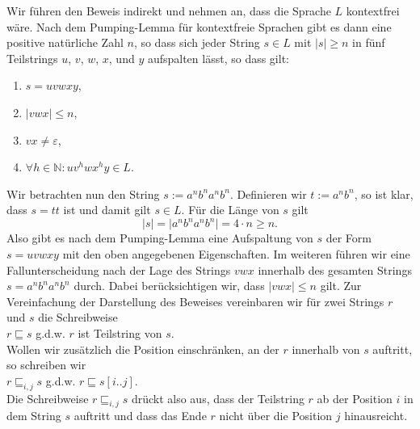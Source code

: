 \solution
Wir f\"uhren den Beweis indirekt und nehmen an, dass die Sprache $L$ kontextfrei
w\"are.  Nach dem Pumping-Lemma f\"ur kontextfreie Sprachen gibt es dann eine positive
nat\"urliche Zahl $n$, so dass sich jeder String $s \in L$ mit $|s| \geq n$ in f\"unf 
Teilstrings $u$, $v$, $w$, $x$, und $y$ aufspalten l\"asst, so dass gilt:
\begin{enumerate}
\item $s = uvwxy$,
\item $|vwx| \leq n$,
\item $vx \not= \varepsilon$,
\item $\forall h \in \mathbb{N}: uv^hwx^hy \in L$. 
\end{enumerate} 
Wir betrachten nun den String $s := a^{n}b^{n}a^{n}b^{n}$.  Definieren wir $t:= a^nb^n$,
so ist klar, dass $s = tt$ ist und damit gilt $s \in L$.
F\"ur die L\"ange von $s$ gilt 
\[ |s| = \big| a^{n}b^{n}a^{n}b^{n} \big| = 4 \cdot n \geq n. \]
Also gibt es nach dem Pumping-Lemma eine Aufspaltung von $s$ der Form $s = uvwxy$ mit den
oben angegebenen Eigenschaften. 
Im weiteren f\"uhren wir eine Fallunterscheidung nach der Lage des Strings $vwx$ innerhalb
des gesamten Strings $s = a^{n}b^{n}a^{n}b^{n}$ durch.  Dabei ber\"ucksichtigen wir, dass
$|vwx| \leq n$ gilt.  Zur Vereinfachung der Darstellung des Beweises vereinbaren wir f\"ur zwei Strings
$r$ und $s$ die Schreibweise 
\\[0.2cm]
\hspace*{1.3cm}
$r \sqsubseteq s$ \quad g.d.w. \quad $r$ ist Teilstring von $s$.
\\[0.2cm]
Wollen wir zus\"atzlich die Position einschr\"anken, an der $r$ innerhalb von $s$ auftritt, so
schreiben wir
\\[0.2cm]
\hspace*{1.3cm}
$r \sqsubseteq_{i,j} s$ \quad g.d.w. \quad
$r \sqsubseteq s[i \mathtt{..} j]$. 
\\[0.2cm]
Die Schreibweise $r \sqsubseteq_{i,j} s$ dr\"uckt also aus, dass der Teilstring $r$ ab der
Position $i$ in dem String $s$ auftritt und dass das Ende $r$ nicht \"uber die Position $j$ hinausreicht.


